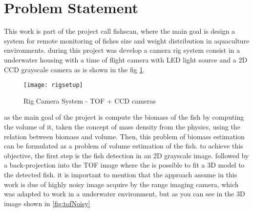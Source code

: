 

\section{Problem Statement}

This work is part of the project call fishscan, where the main goal is design a 
system for remote monitoring of fishes size and weight distribution in aquaculture 
environments. during this project was develop a camera rig system consist in a 
underwater housing with a time of flight camera with LED light source and a 2D CCD 
grayscale camera as is shown in the fig \ref{fig:rigsetup}.

\begin{figure}[h]
\centering
\texttt{[image: rigsetup]}
\caption{Rig Camera System - TOF + CCD cameras}
\label{fig:rigsetup}
\end{figure}


as the main goal of the project is compute the biomass of the fish by computing 
the volume of it, taken the concept of mass density from the physics, using the relation
between biomass and volume. Then, this problem of biomass estimation can be formulated
as a problem of volume estimation of the fish. to achieve this objective, the first 
step is the fish detection in an 2D grayscale image. followed by a back-projection 
into the TOF image where the is possible to fit a 3D model to the detected fish.
it is important to mention that the approach assume in this work is due of highly 
noisy image acquire by the range imaging camera, which was adapted to work in a 
underwater environment, but as you can see in the 3D image shown in \ref{fig:tofNoisy}


